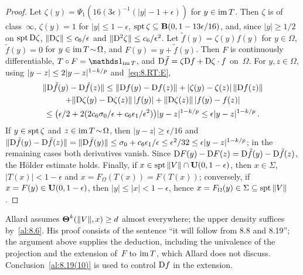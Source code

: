 \begin{proof}
    Let $\zeta(y) = \Psi_1(16 (3 \epsilon)^{-1} (|y| - 1 + \epsilon))$ for $y \in \operatorname{im} T$. Then
    $\zeta$ is of class~$\infty$, $\zeta(y) = 1$ for $|y| \le 1 - \epsilon$, $\operatorname{spt} \zeta \subseteq
    \mathbf{B}(0,1 - 13 \epsilon/16)$, and, since $|y| \ge 1/2$ on $\operatorname{spt} \mathrm{D} \zeta$, $\|\mathrm{D} \zeta\| \le
    c_6/\epsilon$ and $\|\mathrm{D}^2 \zeta\| \le c_6/\epsilon^2$. Let $\tilde f(y) = \zeta(y) f(y)$ for $y
    \in \Omega$, $\tilde f(y) = 0$ for $y \in \operatorname{im} T \!\sim\! \Omega$, and $F(y) = y + \tilde f(y)$.
    Then $F$ is continuously differentiable, $T \circ F = \id{\im T}$, and $\mathrm{D} \tilde f = \zeta \mathrm{D}
    f + \mathrm{D} \zeta \cdot f$ on~$\Omega$. For $y, z \in \Omega$, using $|y - z| \le 2 |y - z|^{1 -
    k/p}$ and~\eqref{eq:8.RT:E},
    \begin{multline*}
        \|\mathrm{D} \tilde f(y) - \mathrm{D} \tilde f(z)\| \le \|\mathrm{D} f(y) - \mathrm{D} f(z)\| + |\zeta(y) - \zeta(z)| \,
        \|\mathrm{D} f(z)\| \\ + \|\mathrm{D} \zeta(y) - \mathrm{D} \zeta(z)\| \, |f(y)| + \|\mathrm{D} \zeta(z)\| \, |f(y) -
        f(z)| \\
        \le \big( \epsilon/2 + 2 (2 c_6 \sigma_0 / \epsilon + c_6 \epsilon_1 / \epsilon^2) \big) |y
        - z|^{1 - k/p} \le \epsilon |y - z|^{1 - k/p} \,.
    \end{multline*}
    If $y \in \operatorname{spt} \zeta$ and $z \in \operatorname{im} T \!\sim\! \Omega$, then $|y - z| \ge \epsilon/16$ and
    $\|\mathrm{D} \tilde f(y) - \mathrm{D} \tilde f(z)\| = \|\mathrm{D} \tilde f(y)\| \le \sigma_0 + c_6 \epsilon_1 /
    \epsilon \le \epsilon^2/32 \le \epsilon |y - z|^{1 - k/p}$; in the remaining cases both
    derivatives vanish. Since $\mathrm{D} F(y) - \mathrm{D} F(z) = \mathrm{D} \tilde f(y) - \mathrm{D} \tilde f(z)$, the
    H\"older estimate holds. Finally, if $x \in \operatorname{spt} \|V\| \cap \mathbf{U}(0,1 - \epsilon)$, then $x \in
    \Sigma$, $|T(x)| < 1 - \epsilon$ and $x = F_\Omega(T(x)) = F(T(x))$; conversely, if $x = F(y)
    \in \mathbf{U}(0,1 - \epsilon)$, then $|y| \le |x| < 1 - \epsilon$, hence $x = F_\Omega(y) \in
    \Sigma \subseteq \operatorname{spt} \|V\|$.
\end{proof}

\begin{remark}
    \label{rem:8.RT}
    Allard assumes $\boldsymbol{\Theta}^{k}(\|V\|,x) \ge d$ almost everywhere; the upper density suffices
    by~\ref{al:8.6}. His proof consists of the sentence ``it will follow from 8.8 and 8.19''; the
    argument above supplies the deduction, including the univalence of the projection and the
    extension of~$F$ to $\operatorname{im} T$, which Allard does not discuss. Conclusion~\ref{al:8.19(10)} is used
    to control $\mathrm{D} f$ in the extension.
\end{remark}

